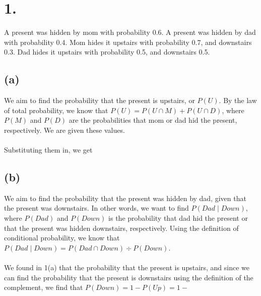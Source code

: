 \documentclass{article}
\begin{document}
\thispagestyle{firstpageheader}

\section*{1.}
{\Large 
A present was hidden by mom with probability 0.6.
A present was hidden by dad with probability 0.4.
Mom hides it upstairs with probability 0.7, and downstairs 0.3.
Dad hides it upstairs with probability 0.5, and downstairs 0.5.

\subsection*{(a)}
We aim to find the probability that the present is upstairs, or $P(U)$. By the law of total probability, we know that $P(U)= P(U \cap M) + P(U \cap D)$, where $P(M)$ and $P(D)$ are the probabilities that mom or dad hid the present, respectively. We are given these values. \\ \\
Substituting them in, we get 

\subsection*{(b)}
We aim to find the probability that the present was hidden by dad, given that the present was downstairs. In other words, we want to find $P(Dad \mid Down)$, where $P(Dad)$ and $P(Down)$ is the probability that dad hid the present or that the present was hidden downstairs, respectively. Using the definition of conditional probability, we know that $P(Dad \mid Down) = P(Dad \cap Down) \div P(Down)$.  \\ \\ We found in 1(a) that the probability that the present is upstairs, and since we can find the probability that the present is downstairs using the definition of the complement, we find that $P(Down) = 1 - P(Up) = 1 - $

}
\end{document}
